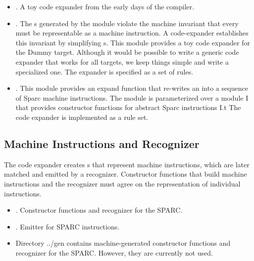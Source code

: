 \documentclass{article}%
\begin{document}
\begin{itemize} \item {}. A toy code expander from
the early days of the compiler.

\item {}. The {\rtl}s generated by the
 module violate the machine invariant that every
{\rtl} must be representable as a machine instruction. A code-expander
establishes this invariant by simplifying {\rtl}s. This module provides
a toy code expander for the {\Tt{}Dummy\nwendquote} target. Although it would be
possible to write a generic code expander that works for all targets, we
keep things simple and write a specialized one. The expander is
specified as a set of {\burg} rules.

\item {}. This module provides an {\Tt{}expand\nwendquote}
function that re-writes an {\rtl} into a sequence of Sparc machine
instructions. The module is parameterized over a module {\Tt{}I\nwendquote} that
provides constructor functions for abstract Sparc instructions {\Tt{}I.t\nwendquote}
The code expander is implemented as a {\burg} rule set. 

\end{itemize}

\subsection{Machine Instructions and Recognizer}

The code expander creates {\rtl}s that represent machine instructions,
which are later matched and emitted by a recognizer. Constructor
functions that build machine instructions and the recognizer must agree
on the representation of individual instructions.

\begin{itemize}
\item {}. Constructor functions and recognizer
for the {\small SPARC}.

\item {}. Emitter for {\small SPARC}
instructions.

\item Directory {\Tt{}../gen\nwendquote} contains machine-generated constructor
functions and recognizer for the {\small SPARC}. However, they are
currently not used.

\end{itemize}
\end{document}
